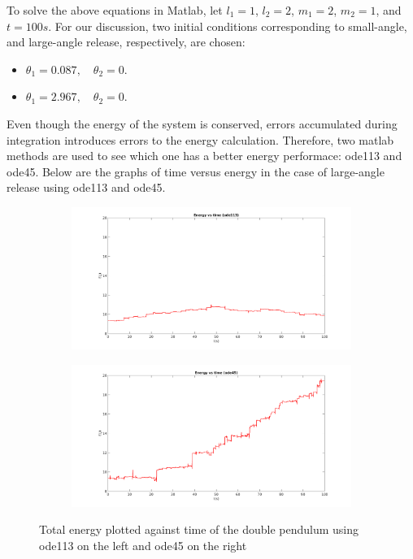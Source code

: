 \documentclass{article}
\begin{document}

To solve the above equations in Matlab, let $l_1 = 1$, $l_2 = 2$, $m_1 = 2$, $m_2 = 1$, and $t = 100s$. For our discussion, two initial conditions corresponding to small-angle, and large-angle release, respectively, are chosen:

\begin{itemize}
	\item $\theta_1 = 0.087,\quad \theta_2 = 0$.
	\item $\theta_1 = 2.967,\quad \theta_2 = 0$.
\end{itemize}

Even though the energy of the system is conserved, errors accumulated during integration introduces errors to the energy calculation. Therefore, two matlab methods are used to see which one has a better energy performace: ode113 and ode45. Below are the graphs of time versus energy in the case of large-angle release using ode113 and ode45.


\begin{figure}[!htbp]
  \begin{subfigure}[b]{0.5\textwidth}
    \includegraphics[width=\textwidth]{e_time_ode1113_bigAng.png}
    \label{fig:f1}
  \end{subfigure}
  \hfill
  \begin{subfigure}[b]{0.5\textwidth}
    \includegraphics[width=\textwidth]{e_time_ode45_bigAng.png}
    \label{fig:f2}
  \end{subfigure}
  \caption{Total energy plotted against time of the double pendulum using ode113 on the left and ode45 on the right}
\end{figure}
\end{document}
